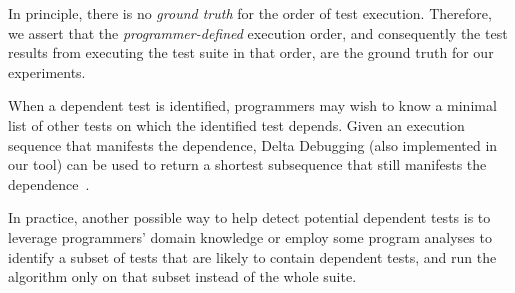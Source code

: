 In principle, there is no \emph{ground truth} for the order of test
execution.
Therefore, we assert that the
\emph{programmer-defined} execution order, and consequently the test
results from executing the test suite in that order, are the ground
truth for our experiments.

When a dependent test is identified, programmers may wish to know
a minimal list of other tests on which the identified test depends. 
Given an execution sequence that manifests the dependence, Delta
Debugging (also implemented in our tool) can
be used to return a shortest subsequence 
that still manifests the dependence~\cite{Zeller:2002}. 


In practice, another possible way to help detect potential dependent tests is
to leverage programmers' domain knowledge or employ some program analyses
to identify a subset of tests that are likely to contain dependent tests,
and run the algorithm only on that subset instead of the whole suite.





